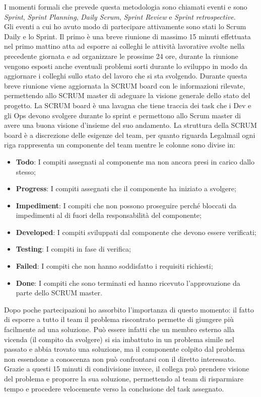 I momenti formali che prevede questa metodologia sono chiamati eventi e sono \textit{Sprint}, \textit{Sprint Planning}, \textit{Daily Scrum}, \textit{Sprint Review} e \textit{Sprint retrospective}.\\
Gli eventi a cui ho avuto modo di partecipare attivamente sono stati lo Scrum Daily e lo Sprint. Il primo è una breve riunione di massimo 15 minuti effettuata nel primo mattino atta ad esporre ai colleghi le attività lavorative svolte nella precedente giornata e ad organizzare le prossime 24 ore, durante la riunione vengono esposti anche eventuali problemi sorti durante lo sviluppo in modo da aggiornare i colleghi sullo stato del lavoro che si sta svolgendo.
Durante questa breve riunione viene aggiornata la SCRUM board con le informazioni rilevate, permettendo allo SCRUM master di adeguare la visione generale dello stato del progetto.
La SCRUM board è una lavagna che tiene traccia dei task che i Dev e gli Ops devono svolgere durante lo sprint e permettono allo Scrum master di avere una buona visione d'insieme del suo andamento. La struttura della SCRUM board è a discrezione delle esigenze del team, per quanto riguarda Legalmail ogni riga rappresenta un componente del team mentre le colonne sono divise in:
\begin{itemize}
	\item \textbf{Todo}: I compiti assegnati al componente ma non ancora presi in carico dallo stesso;
	\item \textbf{Progress}: I compiti assegnati che il componente ha iniziato a svolgere;
	\item \textbf{Impediment}: I compiti che non possono proseguire perché bloccati da impedimenti al di fuori della responsabilità del componente;
	\item \textbf{Developed}: I compiti sviluppati dal componente che devono essere verificati;
	\item \textbf{Testing}: I compiti in fase di verifica;
	\item \textbf{Failed}: I compiti che non hanno soddisfatto i requisiti richiesti;
	\item \textbf{Done}: I compiti che sono terminati ed hanno ricevuto l'approvazione da parte dello SCRUM master.
\end{itemize}
Dopo poche partecipazioni ho assorbito l'importanza di questo momento: il fatto di esporre a tutto il team il problema riscontrato permette di giungere più facilmente ad una soluzione. Può essere infatti che un membro esterno alla vicenda (il compito da svolgere) si sia imbattuto in un problema simile nel passato e abbia trovato una soluzione, ma il componente colpito dal problema non essendone a conoscenza non può confrontarsi con il diretto interessato. Grazie a questi 15 minuti di condivisione invece, il collega può prendere visione del problema e proporre la sua soluzione, permettendo al team di risparmiare tempo e procedere velocemente verso la conclusione del task assegnato.

